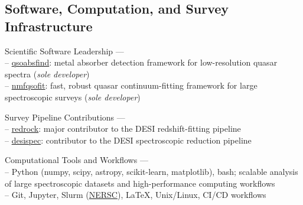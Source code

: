 \documentclass[11pt,letterpaper]{article}
\begin{document}
\subsection{Software, Computation, and Survey Infrastructure}
\begin{list}{}{\cvlist}
\item Scientific Software Leadership --- \\
-- \href{https://github.com/abhi0395/qsoabsfind}{qsoabsfind}: metal absorber detection framework for low-resolution quasar spectra (\textit{sole developer})\\
-- \href{https://github.com/abhi0395/nmfqsofit}{nmfqsofit}: fast, robust quasar continuum-fitting framework for large spectroscopic surveys (\textit{sole developer})

\item Survey Pipeline Contributions --- \\
-- \href{https://github.com/desihub/redrock}{redrock}: major contributor to the DESI redshift-fitting pipeline\\
-- \href{https://github.com/desihub/desispec}{desispec}: contributor to the DESI spectroscopic reduction pipeline

\item Computational Tools and Workflows --- \\
-- Python (numpy, scipy, astropy, scikit-learn, matplotlib), bash; scalable analysis of large spectroscopic datasets and high-performance computing workflows\\
-- Git, Jupyter, Slurm (\href{https://www.nersc.gov/}{NERSC}), LaTeX, Unix/Linux, CI/CD workflows
\end{list}

\vspace{-1.5mm}
\end{document}
